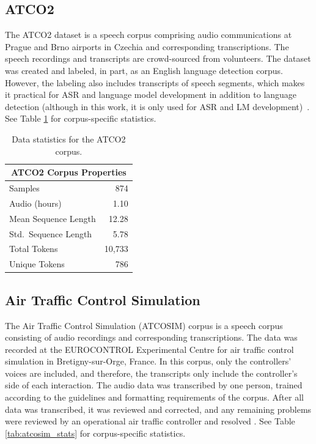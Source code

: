 \documentclass[12pt]{article}
\begin{document}
\subsection{ATCO2}\label{sec:atco2}
The ATCO2 dataset is a speech corpus comprising audio communications at Prague and Brno airports in Czechia and corresponding transcriptions. The
speech recordings and transcripts are crowd-sourced from volunteers. The dataset was created and labeled, in part, as an English language detection
corpus. However, the labeling also includes transcripts of speech segments, which makes it practical for ASR and language model development in
addition to language detection (although in this work, it is only used for ASR and LM development)~\cite{szoke_detecting_2021}.
See Table \ref{tab:atco2_stats} for corpus-specific statistics.

\begin{table}[!t]
    \centering
    \begin{tabular}{l r}
        \toprule
        \multicolumn{2}{c}{ATCO2 Corpus Properties} \\
        \midrule
        Samples              & 874                  \\
        Audio (hours)        & 1.10                 \\
        Mean Sequence Length & 12.28                \\
        Std.~Sequence Length & 5.78                 \\
        Total Tokens         & 10,733               \\
        Unique Tokens        & 786                  \\
        \bottomrule
    \end{tabular}
    \caption{Data statistics for the ATCO2 corpus.}
    \label{tab:atco2_stats}
\end{table}

\subsection{Air Traffic Control Simulation}\label{sec:atcosim}
The Air Traffic Control Simulation (ATCOSIM) corpus is a speech corpus consisting of audio recordings and corresponding transcriptions. The data was
recorded at the EUROCONTROL Experimental Centre for air traffic control simulation in Bretigny-sur-Orge, France. In this corpus, only the controllers'
voices are included, and therefore, the transcripts only include the controller's side of each interaction. The audio data was transcribed by one
person, trained according to the guidelines and formatting requirements of the corpus. After all data was transcribed, it was reviewed and corrected,
and any remaining problems were reviewed by an operational air traffic controller and resolved \cite{hofbauer_atcosim_2008}. See Table
\ref{tab:atcosim_stats} for corpus-specific statistics.
\end{document}
